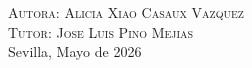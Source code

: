 \begin{titlepage}
\textsc{Autora: Alicia Xiao Casaux Vazquez}\\[1.5cm] %
\textsc{Tutor: Jose Luis Pino Mejias}\\[1.5cm]


{\large %
Sevilla, Mayo de 2026
}\\[1cm] %


 

\vfill %

\cleardoublepage
\thispagestyle{empty}
\end{titlepage}


\raggedbottom



%